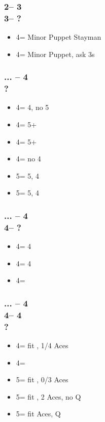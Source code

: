 \documentclass[12pt, a4paper]{article}
\begin{document}
\subsubsection*{2\nt -- 3\hearts\\
                3\spades -- ?}
\begin{itemize}
    \item 4\clubs = Minor Puppet Stayman
    \item 4\diams = Minor Puppet, ask 3s
\end{itemize}

\subsubsection*{... -- 4\clubs\\
                ?}
\begin{itemize}
    \item 4\diams = 4\minor, no 5\minor
    \item 4\hearts = 5+\clubs
    \item 4\spades = 5+\diams
    \item 4\nt = no 4\minor
    \item 5\clubs = 5\clubs, 4\diams
    \item 5\diams = 5\diams, 4\clubs
\end{itemize}

\subsubsection*{... -- 4\clubs\\
                4\diams -- ?}
\begin{itemize}
    \item 4\hearts = 4\clubs
    \item 4\spades = 4\diams
    \item 4\nt = \soff
\end{itemize}

\subsubsection*{... -- 4\clubs\\
                4\diams -- 4\hearts\\
                ?}
\begin{itemize}
    \item 4\spades = fit \clubs, 1/4 Aces
    \item 4\nt = \soff
    \item 5\clubs = fit \clubs, 0/3 Aces
    \item 5\diams = fit \clubs, 2 Aces, no Q\clubs
    \item 5\hearts = fit  Aces, Q\clubs
\end{itemize}
\end{document}
